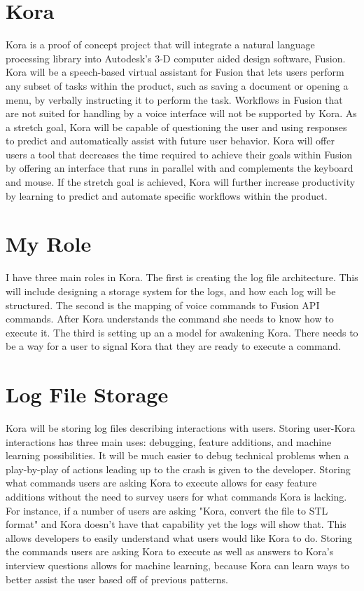 \documentclass[onecolumn, draftclsnofoot,10pt, compsoc]{IEEEtran}
\begin{document}
	\section{Kora}
		Kora is a proof of concept project that will integrate a natural language processing library into Autodesk's 3-D computer aided design software, Fusion.
		Kora will be a speech-based virtual assistant for Fusion that lets users perform any subset of tasks within the product, such as saving a document or opening a menu, by verbally instructing it to perform the task.
		Workflows in Fusion that are not suited for handling by a voice interface will not be supported by Kora.
		As a stretch goal, Kora will be capable of questioning the user and using responses to predict and automatically assist with future user behavior.
		Kora will offer users a tool that decreases the time required to achieve their goals within Fusion by offering an interface that runs in parallel with and complements the keyboard and mouse.
		If the stretch goal is achieved, Kora will further increase productivity by learning to predict and automate specific workflows within the product.
		
		
	\section{My Role}
		I have three main roles in Kora.
		The first is creating the log file architecture.
		This will include designing a storage system for the logs, and how each log will be structured.
		The second is the mapping of voice commands to Fusion API commands.
		After Kora understands the command she needs to know how to execute it.
		The third is setting up an a model for awakening Kora.
		There needs to be a way for a user to signal Kora that they are ready to execute a command.
		
		
	\section{Log File Storage}
		Kora will be storing log files describing interactions with users.
		Storing user-Kora interactions has three main uses: debugging, feature additions, and machine learning possibilities.
		It will be much easier to debug technical problems when a play-by-play of actions leading up to the crash is given to the developer.
		Storing what commands users are asking Kora to execute allows for easy feature additions without the need to survey users for what commands Kora is lacking.
		For instance, if a number of users are asking "Kora, convert the file to STL format" and Kora doesn't have that capability yet the logs will show that.
		This allows developers to easily understand what users would like Kora to do.
		Storing the commands users are asking Kora to execute as well as answers to Kora's interview questions allows for machine learning, because Kora can learn ways to better assist the user based off of previous patterns.
\end{document}

